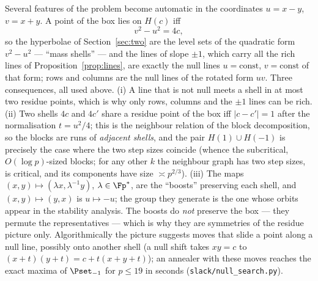 \begin{remark}\label{rem:lightcone}
Several features of the problem become automatic in the coordinates $u=x-y$, $v=x+y$.  A point of the box lies on $H(c)$ iff
\[
 v^2-u^2=4c ,
\]
so the hyperbolae of Section~\ref{sec:two} are the level sets of the quadratic form $v^2-u^2$ --- ``mass shells'' --- and the lines of
slope $\pm1$, which carry all the rich lines of Proposition~\ref{prop:lines}, are exactly the null lines $u=\mathrm{const}$,
$v=\mathrm{const}$ of that form; rows and columns are the null lines of the rotated form $uv$.  Three consequences, all used above.
(i) A line that is not null meets a shell in at most two residue points, which is why only rows, columns and the $\pm1$ lines can be rich.
(ii) Two shells $4c$ and $4c'$ share a residue point of the box iff $|c-c'|=1$ after the normalisation $t=u^2/4$; this is the neighbour
relation of the block decomposition, so the blocks are runs of \emph{adjacent shells}, and the pair $H(1)\cup H(-1)$ is precisely the case
where the two step sizes coincide (whence the subcritical, $O(\log p)$-sized blocks; for any other $k$ the neighbour graph has two step
sizes, is critical, and its components have size $\asymp p^{2/3}$).
(iii) The maps $(x,y)\mapsto(\lambda x,\lambda^{-1}y)$, $\lambda\in\Fp^*$, are the ``boosts'' preserving each shell, and
$(x,y)\mapsto(y,x)$ is $u\mapsto-u$; the group they generate is the one whose orbits appear in the stability analysis.  The boosts do
\emph{not} preserve the box --- they permute the representatives --- which is why they are symmetries of the residue picture only.
Algorithmically the picture suggests moves that slide a point along a null line, possibly onto another shell (a null shift takes
$xy=c$ to $(x+t)(y+t)=c+t(x+y+t)$); an annealer with these moves reaches the exact maxima of $\Pset_{-1}$ for $p\le19$ in seconds
(\texttt{slack/null\_search.py}).
\end{remark}

